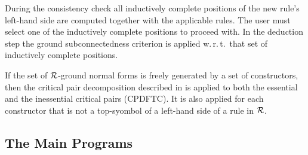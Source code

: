 During the consistency check all inductively complete positions of the new
rule's left-hand side are computed together with the applicable rules.
The user must select one of the inductively complete positions to proceed with.
In the deduction step the ground subconnectedness criterion is applied 
w.\,r.\,t.\ that set of inductively complete positions.

If the set of $\cal R$-ground normal forms is freely generated by a set of
constructors, then the critical pair decomposition described in
\cite{HuetHullot:80} is applied to both the essential and the inessential
critical pairs (CPDFTC).
It is also applied for  each constructor that is not a top-syombol
of a left-hand side of a rule in $\cal R$.

\subsection{The Main Programs}

